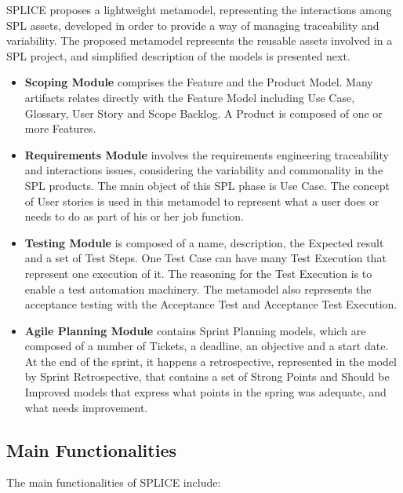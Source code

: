\ac{SPLICE} proposes a lightweight metamodel, representing the interactions among \ac{SPL}
assets, developed in order to provide a way of managing traceability and variability. 
The proposed metamodel represents the reusable assets involved in a \ac{SPL} project, and 
simplified description of the models is presented next.

\begin{itemize}
\item \textbf{Scoping Module} comprises the Feature and the Product Model. Many artifacts relates 
directly with the Feature Model including Use Case, Glossary, User Story and Scope Backlog. 
A Product is composed of one or more Features.

\item \textbf{Requirements Module} involves the requirements engineering
traceability and interactions issues, considering the variability and commonality in the \ac{SPL} 
products. The main object of this \ac{SPL} phase is Use Case. The concept of User stories is used 
in this metamodel to represent what a user does or needs to do as part of his or her job function. 
 
\item \textbf{Testing Module} is composed of a name, description, the
Expected result and a set of Test Steps. One Test Case can have many Test Execution that 
represent one execution of it. The reasoning for the Test Execution is to enable a test 
automation machinery. The metamodel also represents the acceptance testing with the Acceptance 
Test and Acceptance Test Execution. 

\item \textbf{Agile Planning Module} contains Sprint Planning models, which are composed of a number of Tickets, a
deadline, an objective and a start date. At the end of the sprint, it happens a retrospective, 
represented in the model by Sprint Retrospective, that contains a set of Strong Points and Should be 
Improved models that express what points in the spring was adequate, and what needs improvement.
\end{itemize}

\subsection{Main Functionalities}

The main functionalities of \ac{SPLICE} include:

